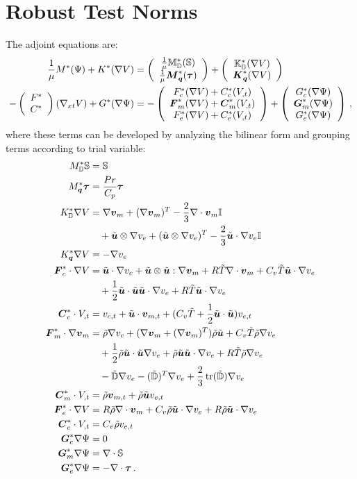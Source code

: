 \documentclass[Dissertation.tex]{subfiles}
\begin{document}
\section{Robust Test Norms}
The adjoint equations are:
\begin{align*}
\frac{1}{\mu}M^*(\Psi)+K^*(\nabla V)&=\left( \begin{array}{c} \frac{1}{\mu}\mathbb{M}_{\mathbb{D}}^*(\mathbb{S})\\ \frac{1}{\mu}\boldsymbol M_{\boldsymbol q}^*(\boldsymbol\tau)\\ \end{array} \right)
+\left( \begin{array}{c} \mathbb{K}_{\mathbb{D}}^*(\nabla V)\\ \boldsymbol K_{\boldsymbol q}^*(\nabla V)\\ \end{array} \right)\\
-\left( \begin{array}{c} F^*\\ C^*\\ \end{array} \right)(\nabla_{xt} V)+G^*(\nabla\Psi)&=-\left( \begin{array}{c} F_c^*(\nabla V)+C_c^*(V_{,t})\\ \boldsymbol F_m^*(\nabla V)+\boldsymbol C_m^*(V_{,t})\\ F_e^*(\nabla V)+C_e^*(V_{,t})\\ \end{array} \right)
+\left( \begin{array}{c} G_c^*(\nabla\Psi)\\ \boldsymbol G_m^*(\nabla\Psi)\\ G_e^*(\nabla\Psi)\\ \end{array} \right)\,,
\end{align*}
where
these terms can be developed by analyzing the bilinear form and grouping terms according to trial variable:
\begin{align*}
M_\bbD^*\bbS&=\bbS\\
M_{\bfq}^*\bftau&=\frac{Pr}{C_p}\bftau\\
K_\bbD^*\Grad V&=\Grad\bfv_m+(\Grad\bfv_m)^T-\frac{2}{3}\Div\bfv_m\bbI
\\&\quad
+\tilde\bfu\otimes\Grad v_e+(\tilde\bfu\otimes\Grad v_e)^T-\frac{2}{3}\tilde\bfu\cdot\Grad v_e\bbI\\
K_{\bfq}^*\Grad V&=-\Grad v_e\\
\bfF_c^*\cdot\Grad V&=
\tilde\bfu\cdot\Grad v_c
+\tilde\bfu\otimes\tilde\bfu:\Grad\bfv_m+R\tilde T\Div\bfv_m
+C_v\tilde T\tilde\bfu\cdot\Grad v_e
\\&\quad
+\frac{1}{2}\tilde\bfu\cdot\tilde\bfu\tilde\bfu\cdot\Grad v_e+R\tilde T\tilde\bfu\cdot\Grad v_e\\
%
\bfC_c^*\cdot V_{,t}&=v_{c,t}+\tilde\bfu\cdot\bfv_{m,t}+(C_v\tilde T+\frac{1}{2}\tilde\bfu\cdot\tilde\bfu)v_{e,t}\\
%
\bfF_m^*\cdot\Grad\bfv_m&=\tilde\rho\Grad v_c
+(\Grad\bfv_m+(\Grad\bfv_m)^T)\tilde\rho\tilde\bfu
+C_v\tilde T\tilde\rho\Grad v_e
\\&\quad
+\frac{1}{2}\tilde\rho\tilde\bfu\cdot\tilde\bfu\Grad v_e+\tilde\rho\tilde\bfu\tilde\bfu\cdot\Grad v_e
+R\tilde T\tilde\rho\Grad v_e\\ 
&\quad-\tilde{\bbD}\Grad v_e-(\tilde{\bbD})^T\Grad v_e+\frac{2}{3}\trace(\tilde{\bbD})\Grad v_e
\\
%
\bfC_m^*\cdot V_{,t}&=\tilde\rho\bfv_{m,t}+\tilde\rho\tilde\bfu v_{e,t}\\
%
\bfF_e^*\cdot\Grad V&=R\tilde\rho\Div\bfv_m+C_v\tilde\rho\tilde\bfu\cdot\Grad v_e+R\tilde\rho\tilde\bfu\cdot\Grad v_e\\
%
\bfC_e^*\cdot V_{,t}&=C_v\tilde\rho v_{e,t}\\
%
\bfG_c^*\Grad\Psi&=0\\
%
\bfG_m^*\Grad\Psi&=\Div\bbS\\
%
\bfG_e^*\Grad\Psi&=-\Div\bftau
\,.
\end{align*}
\end{document}
